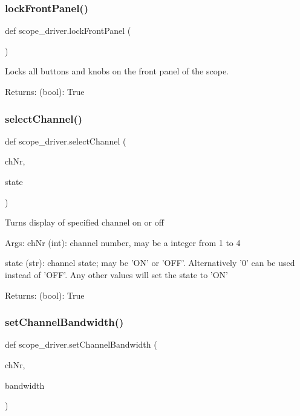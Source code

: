 \subsubsection{\texorpdfstring{lock\+Front\+Panel()}{lockFrontPanel()}}
{\footnotesize\ttfamily def scope\+\_\+driver.\+lock\+Front\+Panel (\begin{DoxyParamCaption}{ }\end{DoxyParamCaption})}

\begin{DoxyVerb}Locks all buttons and knobs on the front panel of the scope.

Returns:
    (bool): True
\end{DoxyVerb}
 \mbox{\label{namespacescope__driver_a2799aba24b2205b99289f820ef95f42e}} 
\subsubsection{\texorpdfstring{select\+Channel()}{selectChannel()}}
{\footnotesize\ttfamily def scope\+\_\+driver.\+select\+Channel (\begin{DoxyParamCaption}\item[{}]{ch\+Nr,  }\item[{}]{state }\end{DoxyParamCaption})}

\begin{DoxyVerb}Turns display of specified channel on or off

Args:
    chNr (int): channel number, may be a integer from 1 to 4
    
    state (str): channel state; may be 'ON' or 'OFF'.
        Alternatively '0' can be used instead of 'OFF'. Any other
        values will set the state to 'ON'

Returns:
    (bool): True
\end{DoxyVerb}
 \mbox{\label{namespacescope__driver_a372ba6fbecc6901d912839bc234a4150}} 
\subsubsection{\texorpdfstring{set\+Channel\+Bandwidth()}{setChannelBandwidth()}}
{\footnotesize\ttfamily def scope\+\_\+driver.\+set\+Channel\+Bandwidth (\begin{DoxyParamCaption}\item[{}]{ch\+Nr,  }\item[{}]{bandwidth }\end{DoxyParamCaption})}

